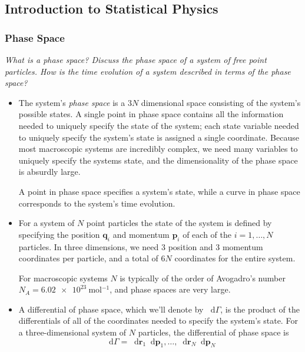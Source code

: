 \documentclass[11pt, a4paper]{article}
\newcommand{\diff}{\mathop{}\!\mathrm{d}} %
\begin{document}
\subsection{Introduction to Statistical Physics}

\subsubsection{Phase Space}
\textit{ What is a phase space? Discuss the phase space of a system of free point particles. How is the time evolution of a system described in terms of the phase space?}
 \begin{itemize}
	 \item The system's \textit{phase space} is a $ 3N $ dimensional space consisting of the system's possible states. A single point in phase space contains all the information needed to uniquely specify the state of the system; each state variable needed to uniquely specify the system's state is assigned a single coordinate. Because most macroscopic systems are incredibly complex, we need many variables to uniquely specify the systems state, and the dimensionality of the phase space is absurdly large. 
	 
	 A point in phase space specifies a system's state, while a curve in phase space corresponds to the system's time evolution.
	 
	 \item For a system of $ N $ point particles the state of the system is defined by specifying the position $ \bm{q}_{i} $ and momentum $ \bm{p}_{i} $ of each of the $ i = 1, \ldots, N $ particles. In three dimensions, we need 3 position and 3 momentum coordinates per particle, and a total of $ 6N $ coordinates for the entire system. 
	 
	 For macroscopic systems $ N $ is typically of the order of Avogadro's number $ N_{A} = \SI{6.02e23}{\mole^{-1}} $, and phase spaces are very large.
	 
	 \item A differential of phase space, which we'll denote by $ \diff \Gamma $, is the product of the differentials of all of the coordinates needed to specify the system's state. For a three-dimensional system of $ N $ particles, the differential of phase space is
	 \begin{equation*}
		 \diff \Gamma = \diff \bm{r}_{1} \diff \bm{p}_{1}, \ldots, \diff \bm{r}_{N} \diff \bm{p}_{N}
	 \end{equation*}
 
 \end{itemize}
\end{document}
